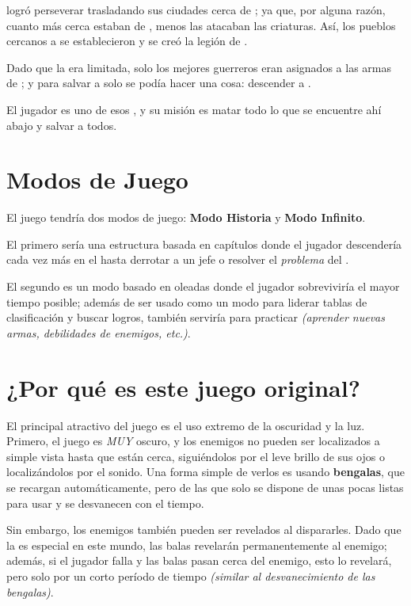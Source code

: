 \begin{multicols}{2}
    \humanity logró perseverar trasladando sus ciudades cerca de \hole; ya que, por alguna razón, cuanto más cerca estaban de \hole, menos las atacaban las criaturas. Así, los pueblos cercanos a \hole se establecieron y se creó la legión de \hunters.

    Dado que la \gunpowder era limitada, solo los mejores guerreros eran asignados a las armas de \gunpowder; y para salvar a \humanity solo se podía hacer una cosa: descender a \hole.

    El jugador es uno de esos \hunters, y su misión es matar todo lo que se encuentre ahí abajo y salvar a todos.


    \section{Modos de Juego}
    El juego tendría dos modos de juego: \textbf{Modo Historia} y \textbf{Modo Infinito}.

    El primero sería una estructura basada en capítulos donde el jugador descendería cada vez más en el \hole hasta derrotar a un jefe o resolver el \textit{problema} del \hole.

    El segundo es un modo basado en oleadas donde el jugador sobreviviría el mayor tiempo posible; además de ser usado como un modo para liderar tablas de clasificación y buscar logros, también serviría para practicar \textit{(aprender nuevas armas, debilidades de enemigos, etc.)}.


    \section{¿Por qué es este juego original?}
    El principal atractivo del juego es el uso extremo de la oscuridad y la luz. Primero, el juego es \textit{MUY} oscuro, y los enemigos no pueden ser localizados a simple vista hasta que están cerca, siguiéndolos por el leve brillo de sus ojos o localizándolos por el sonido. Una forma simple de verlos es usando \textbf{bengalas}, que se recargan automáticamente, pero de las que solo se dispone de unas pocas listas para usar y se desvanecen con el tiempo.

    Sin embargo, los enemigos también pueden ser revelados al dispararles. Dado que la \gunpowder es especial en este mundo, las balas revelarán permanentemente al enemigo; además, si el jugador falla y las balas pasan cerca del enemigo, esto lo revelará, pero solo por un corto período de tiempo \textit{(similar al desvanecimiento de las bengalas)}.


\end{multicols}
